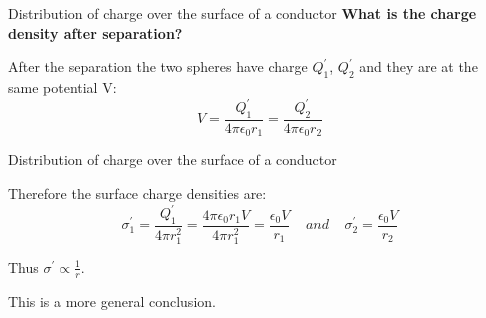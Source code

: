 \begin{frame}{Distribution of charge over the surface of a conductor}
{\bf What is the charge density after separation?}\\

\vspace{0.3cm}

After the separation the two spheres have charge $Q_1^{\prime}$, $Q_2^{\prime}$
and they are at the same potential V:
\begin{equation*}
   V = \frac{Q_1^{\prime}}{4\pi \epsilon_0 r_1} = \frac{Q_2^{\prime}}{4\pi \epsilon_0 r_2}
\end{equation*}

\end{frame}

%
%
%

\begin{frame}{Distribution of charge over the surface of a conductor}

Therefore the surface charge densities are:
\begin{equation*}
   \sigma_1^{\prime} =
       \frac{Q_1^{\prime}}{4\pi r_1^2} =
       \frac{4 \pi \epsilon_0 r_1 V}{4\pi r_1^2} =
       \frac{\epsilon_0 V}{r_1}
    \;\;\;\; and \;\;\;\;
   \sigma_2^{\prime} = \frac{\epsilon_0 V}{r_2}
\end{equation*}

\vspace{0.2cm}

Thus {\bf $\sigma^{\prime} \propto \frac{1}{r}$}.\\
\vspace{0.2cm}

This is a more general conclusion.\\
\vspace{0.2cm}


\end{frame}
